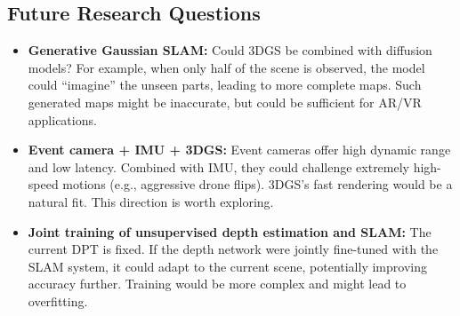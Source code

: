 \documentclass[12pt,a4paper,onecolumn]{article}
\begin{document}
\subsection{Future Research Questions}

\begin{itemize}
    \item \textbf{Generative Gaussian SLAM:} Could 3DGS be combined with diffusion models? For example, when only half of the scene is observed, the model could ``imagine'' the unseen parts, leading to more complete maps. Such generated maps might be inaccurate, but could be sufficient for AR/VR applications.

    \item \textbf{Event camera + IMU + 3DGS:} Event cameras offer high dynamic range and low latency. Combined with IMU, they could challenge extremely high-speed motions (e.g., aggressive drone flips). 3DGS's fast rendering would be a natural fit. This direction is worth exploring.

    \item \textbf{Joint training of unsupervised depth estimation and SLAM:} The current DPT \citep{DPT} is fixed. If the depth network were jointly fine-tuned with the SLAM system, it could adapt to the current scene, potentially improving accuracy further. Training would be more complex and might lead to overfitting.
\end{itemize}
\end{document}
